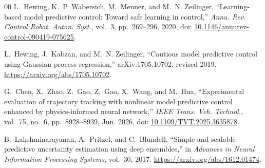 \documentclass[10pt,journal]{IEEEtran}
\begin{document}
%
%    
%    

\begin{thebibliography}{00}
L.~Hewing, K.~P. Wabersich, M.~Menner, and M.~N. Zeilinger,
``Learning-based model predictive control: Toward safe learning in control,''
\emph{Annu. Rev. Control Robot. Auton. Syst.}, vol.~3, pp.~269--296, 2020,
doi: \href{https://doi.org/10.1146/annurev-control-090419-075625}{10.1146/annurev-control-090419-075625}.

L.~Hewing, J.~Kabzan, and M.~N. Zeilinger,
``Cautious model predictive control using Gaussian process regression,''
arXiv:1705.10702, revised 2019.
\url{https://arxiv.org/abs/1705.10702}.

G.~Chen, X.~Zhao, Z.~Gao, Z.~Gao, X.~Wang, and M.~Hua,
``Experimental evaluation of trajectory tracking with nonlinear model
predictive control enhanced by physics-informed neural network,''
\emph{IEEE Trans. Veh. Technol.}, vol.~75, no.~6,
pp.~8928--8939, Jun. 2026, doi:
\href{https://doi.org/10.1109/TVT.2025.3635878}{10.1109/TVT.2025.3635878}.


B.~Lakshminarayanan, A.~Pritzel, and C.~Blundell,
``Simple and scalable predictive uncertainty estimation using deep ensembles,''
in \emph{Advances in Neural Information Processing Systems}, vol.~30, 2017.
\url{https://arxiv.org/abs/1612.01474}.
\end{thebibliography}
\end{document}
